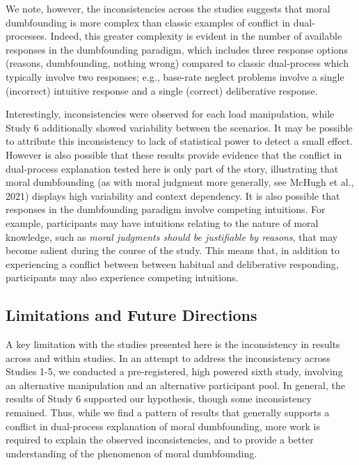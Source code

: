 \documentclass[
  american,
  man,floatsintext]{apa7}
\begin{document}
We note, however, the inconsistencies across the studies suggests that moral dumbfounding is more complex than classic examples of conflict in dual-processes. Indeed, this greater complexity is evident in the number of available responses in the dumbfounding paradigm, which includes three response options (reasons, dumbfounding, nothing wrong) compared to classic dual-process which typically involve two responses; e.g., base-rate neglect problems involve a single (incorrect) intuitive response and a single (correct) deliberative response.

Interestingly, inconsistencies were observed for each load manipulation, while Study 6 additionally showed variability between the scenarios. It may be possible to attribute this inconsistency to lack of statistical power to detect a small effect. However is also possible that these results provide evidence that the conflict in dual-process explanation tested here is only part of the story, illustrating that moral dumbfounding (as with moral judgment more generally, see McHugh et al., 2021) displays high variability and context dependency. It is also possible that responses in the dumbfounding paradigm involve competing intuitions. For example, participants may have intuitions relating to the nature of moral knowledge, such as \emph{moral judgments should be justifiable by reasons}, that may become salient during the course of the study. This means that, in addition to experiencing a conflict between between habitual and deliberative responding, participants may also experience competing intuitions.

\hypertarget{limitations-and-future-directions}{%
\subsection{Limitations and Future Directions}\label{limitations-and-future-directions}}

A key limitation with the studies presented here is the inconsistency in results across and within studies. In an attempt to address the inconsistency across Studies 1-5, we conducted a pre-registered, high powered sixth study, involving an alternative manipulation and an alternative participant pool. In general, the results of Study 6 supported our hypothesis, though some inconsistency remained. Thus, while we find a pattern of results that generally supports a conflict in dual-process explanation of moral dumbfounding, more work is required to explain the observed inconsistencies, and to provide a better understanding of the phenomenon of moral dumbfounding.
\end{document}

